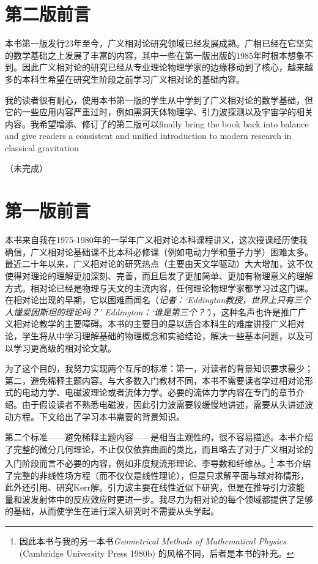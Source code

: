 \chapter*{第二版前言}
本书第一版发行23年至今，广义相对论研究领域已经发展成熟。广相已经在它坚实的数学基础之上发展了丰富的内容，其中一些在第一版出版的1985年时根本想象不到。因此广义相对论的研究已经从专业理论物理学家的边缘移动到了核心，越来越多的本科生希望在研究生阶段之前学习广义相对论的基础内容。

我的读者很有耐心，使用本书第一版的学生从中学到了广义相对论的数学基础，但它的一些应用内容严重过时，例如黑洞天体物理学、引力波探测以及宇宙学的相关内容。我希望增添、修订了的第二版可以finally bring the book back into balance and give
readers a consistent and unified introduction to modern research in classical gravitation

（未完成）


\chapter*{第一版前言}
本书来自我在1975-1980年的一学年广义相对论本科课程讲义，这次授课经历使我确信，广义相对论基础课不比本科必修课（例如电动力学和量子力学）困难太多。最近二十年以来，广义相对论的研究热点（主要由天文学驱动）大大增加，这不仅使得对理论的理解更加深刻、完善，而且启发了更加简单、更加有物理意义的理解方式。相对论已经是物理与天文的主流内容，任何理论物理学家都学习过这门课。在相对论出现的早期，它以困难而闻名（\textit{记者：‘Eddington教授，世界上只有三个人懂爱因斯坦的理论吗？’ Eddington：‘谁是第三个？’}），这种名声也许是推广广义相对论教学的主要障碍。本书的主要目的是以适合本科生的难度讲授广义相对论，学生将从中学习理解基础的物理概念和实验结论，解决一些基本问题，以及可以学习更高级的相对论文献。

为了这个目的，我努力实现两个互斥的标准：第一，对读者的背景知识要求最少；第二，避免稀释主题内容。与大多数入门教材不同，本书不需要读者学过相对论形式的电动力学、电磁波理论或者流体力学。必要的流体力学内容在专门的章节介绍。由于假设读者不熟悉电磁波，因此引力波需要较缓慢地讲述，需要从头讲述波动方程。下文给出了学习本书需要的背景知识。

第二个标准——避免稀释主题内容——是相当主观性的，很不容易描述。本书介绍了完整的微分几何理论，不止仅仅依靠曲面的类比，而且略去了对于广义相对论的入门阶段而言不必要的内容，例如非度规流形理论、李导数和纤维丛。\footnote{因此本书与我的另一本书\textit{Geometrical Methods of Mathematical Physics} (Cambridge University Press 1980b) 的风格不同，后者是本书的补充。} 本书介绍了完整的非线性场方程（而不仅仅是线性理论），但是只求解平面与球对称情形，此外还引用、研究Kerr解。引力波主要在线性近似下研究，但是在推导引力波能量和波发射体中的反应效应时更进一步。我尽力为相对论的每个领域都提供了足够的基础，从而使学生在进行深入研究时不需要从头学起。

